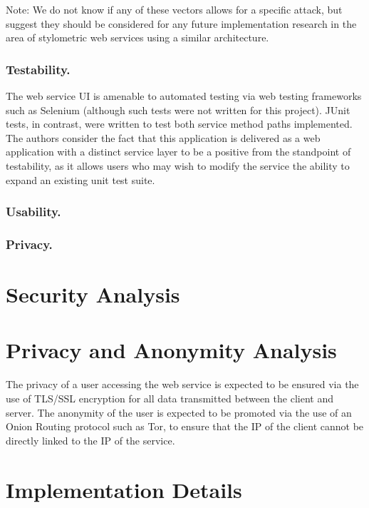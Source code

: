 \documentclass[letterpaper]{article}
\begin{document}
Note: We do not know if any of these vectors allows for a specific
attack, but suggest they should be considered for any future
implementation research in the area of stylometric web services using
a similar architecture.

\subsubsection{Testability.}

The web service UI is amenable to automated testing via web testing
frameworks such as Selenium (although such tests were not written for
this project). JUnit tests, in contrast, were written to test both
service method paths implemented. The authors consider the fact that
this application is delivered as a web application with a distinct
service layer to be a positive from the standpoint of testability, as
it allows users who may wish to modify the service the ability to
expand an existing unit test suite.

\subsubsection{Usability.}

\subsubsection{Privacy.}


\section{Security Analysis}

\section{Privacy and Anonymity Analysis}

The privacy of a user accessing the web service is expected to be
ensured via the use of TLS/SSL encryption for all data transmitted
between the client and server. The anonymity of the user is expected
to be promoted via the use of an Onion Routing protocol such as Tor,
to ensure that the IP of the client cannot be directly linked to the
IP of the service.

\section{Implementation Details}
\end{document}
